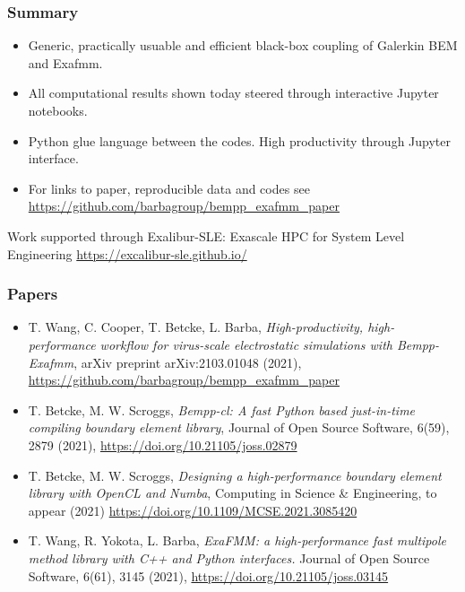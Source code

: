 \documentclass[dvipsnames,10pt]{beamer}
\begin{document}
\begin{frame}
    \frametitle{Summary}

    \begin{itemize}
        \item Generic, practically usuable and efficient black-box coupling of Galerkin
            BEM and Exafmm.
        \item All computational results shown today steered through interactive Jupyter
            notebooks.
        \item Python glue language between the codes. High productivity through Jupyter
            interface.
        \item For links to paper, reproducible data and codes see\\
            \url{https://github.com/barbagroup/bempp_exafmm_paper}
    \end{itemize}

    \begin{tcolorbox}
        Work supported through Exalibur-SLE: Exascale HPC for System Level Engineering 
    \url{https://excalibur-sle.github.io/}
    \end{tcolorbox}

\end{frame}

\begin{frame}
    \frametitle{Papers}

{
    \small

\begin{itemize}
    \item T. Wang, C. Cooper, T. Betcke, L. Barba, \textit{High-productivity, 
        high-performance workflow for virus-scale electrostatic simulations with 
    Bempp-Exafmm}, arXiv preprint arXiv:2103.01048 (2021), 
    \url{https://github.com/barbagroup/bempp_exafmm_paper}
    \item T. Betcke, M. W. Scroggs, \textit{Bempp-cl: A fast Python based 
        just-in-time compiling boundary element library}, 
        Journal of Open Source Software, 6(59), 2879 (2021), 
            \url{https://doi.org/10.21105/joss.02879}
    \item T. Betcke, M. W. Scroggs, \textit{Designing a high-performance boundary 
        element library with OpenCL and Numba}, 
        Computing in Science \& Engineering, to appear (2021) 
        \url{https://doi.org/10.1109/MCSE.2021.3085420} 
    \item T. Wang, R. Yokota, L. Barba, \textit{ExaFMM: a high-performance 
            fast multipole method library with C++ and Python interfaces.}
        Journal of Open Source Software, 6(61), 3145 (2021),
        \url{https://doi.org/10.21105/joss.03145}
    \end{itemize}

}


    \vspace{1cm}


\end{frame}
\end{document}
